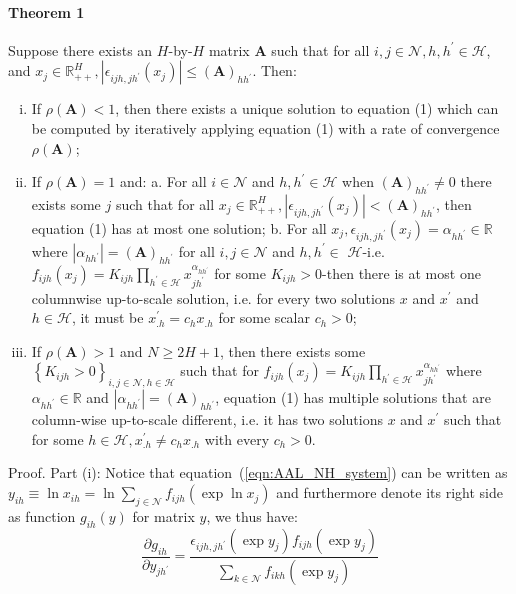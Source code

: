 \paragraph{Theorem 1}
Suppose there exists an $H$-by-$H$ matrix $\mathbf{A}$ 
such that for all $i, j \in \mathcal{N}, h, h^{\prime} \in \mathcal{H}$, 
and $x_j \in \mathbb{R}_{++}^H,\left|\epsilon_{i j h, j h^{\prime}}\left(x_j\right)\right| \leq(\mathbf{A})_{h h^{\prime}}$. 
Then:
\begin{enumerate}[(i)]
    \item If $\rho(\mathbf{A})<1$, then there exists a unique solution to equation (1) which can be computed by iteratively applying equation (1) with a rate of convergence $\rho \mathbf{( A )}$;
    \item If $\rho(\mathbf{A})=1$ and:
    a. For all $i \in \mathcal{N}$ and $h, h^{\prime} \in \mathcal{H}$ when $(\mathbf{A})_{h h^{\prime}} \neq 0$ there exists some $j$ such that for all $x_j \in \mathbb{R}_{++}^H,\left|\epsilon_{i j h, j h^{\prime}}\left(x_j\right)\right|<(\mathbf{A})_{h h^{\prime}}$, then equation (1) has at most one solution;
    b. For all $x_j, \epsilon_{i j h, j h^{\prime}}\left(x_j\right)=\alpha_{h h^{\prime}} \in \mathbb{R}$ where $\left|\alpha_{h h^{\prime}}\right|=(\mathbf{A})_{h h^{\prime}}$ for all $i, j \in \mathcal{N}$ and $h, h^{\prime} \in$ $\mathcal{H}$-i.e. $f_{i j h}\left(x_j\right)=K_{i j h} \prod_{h^{\prime} \in \mathcal{H}} x_{j h^{\prime}}^{\alpha_{h h^{\prime}}}$ for some $K_{i j h}>0$-then there is at most one columnwise up-to-scale solution, i.e. for every two solutions $x$ and $x^{\prime}$ and $h \in \mathcal{H}$, it must be $x_{. h}^{\prime}=c_h x_{. h}$ for some scalar $c_h>0$;
    \item If $\rho(\mathbf{A})>1$ and $N \geq 2 H+1$, then there exists some $\left\{K_{i j h}>0\right\}_{i, j \in \mathcal{N}, h \in \mathcal{H}}$ such that for $f_{i j h}\left(x_j\right)=K_{i j h} \prod_{h^{\prime} \in \mathcal{H}} x_{j h^{\prime}}^{\alpha_{h h^{\prime}}}$ where $\alpha_{h h^{\prime}} \in \mathbb{R}$ and $\left|\alpha_{h h^{\prime}}\right|=(\mathbf{A})_{h h^{\prime}}$, equation (1) has multiple solutions that are column-wise up-to-scale different, i.e. it has two solutions $x$ and $x^{\prime}$ such that for some $h \in \mathcal{H}, x_{. h}^{\prime} \neq c_h x_{. h}$ with every $c_h>0$.
    
\end{enumerate}

\noindent Proof. Part (i): Notice that equation~(\ref{eqn:AAL_NH_system}) 
can be written as 
$y_{i h} \equiv \ln x_{i h}=\ln \sum_{j \in \mathcal{N}} f_{i j h}\left(\exp \ln x_j\right)$ 
and furthermore denote its right side as function $g_{i h}(y)$ for matrix $y$, we thus have:
\begin{equation}
    \label{eqn:proof_part_i1}
    \frac{\partial g_{i h}}{\partial y_{j h^{\prime}}}=\frac{\epsilon_{i j h, j h^{\prime}}\left(\exp y_j\right) f_{i j h}\left(\exp y_j\right)}{\sum_{k \in \mathcal{N}} f_{i k h}\left(\exp y_j\right)}
\end{equation}



